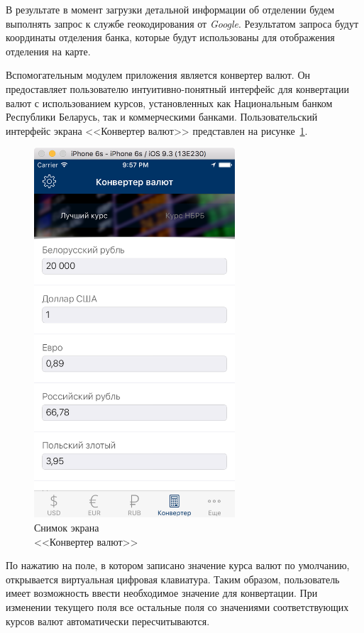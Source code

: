 В результате в момент загрузки детальной информации об отделении будем выполнять
запрос к службе геокодирования от \textit{Google}. Результатом запроса будут
координаты отделения банка, которые будут использованы для отображения отделения
на карте.

\newpage

Вспомогательным модулем приложения является конвертер валют. Он предоставляет
пользователю интуитивно-понятный интерфейс для конвертации валют с использованием
курсов, установленных как Национальным банком Республики Беларусь, так и
коммерческими банками.
Пользовательский интерфейс экрана <<Конвертер валют>> представлен на
рисунке~\ref{fig:converter_screen}.
\begin{figure}[h!]
  \centering
  \includegraphics[width=75mm]{fig/converter_screen}
  \caption{Снимок экрана \\ <<Конвертер валют>>}
  \label{fig:converter_screen}
\end{figure}

По нажатию на поле, в котором записано значение курса валют по умолчанию,
открывается виртуальная цифровая клавиатура. Таким образом, пользователь имеет
возможность ввести необходимое значение для конвертации. При изменении текущего
поля все остальные поля со значениями соответствующих курсов валют
автоматически пересчитываются.


